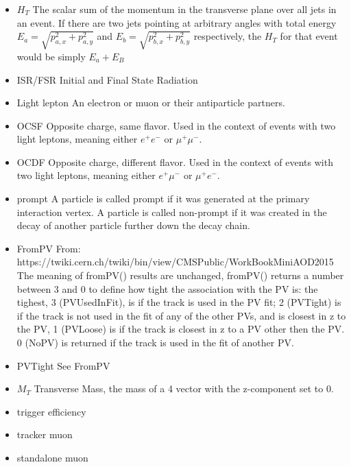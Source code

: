 \begin{itemize}

\item{$H_T$} The scalar sum of the momentum in the transverse plane over all jets in an event. If there are two jets pointing at arbitrary angles with total energy $E_a=\sqrt{p_{a,x}^2 + p_{a,y}^2}$ and $E_b=\sqrt{p_{b,x}^2 + p_{b,y}^2}$ respectively, the $H_T$ for that event would be simply $E_a + E_B$

\item{ISR/FSR} Initial and Final State Radiation

\item{Light lepton} An electron or muon or their antiparticle partners.

\item{OCSF} Opposite charge, same flavor. Used in the context of events with two light leptons, meaning either $e^+e^-$ or $\mu^+ \mu^-$.

\item{OCDF} Opposite charge, different flavor. Used in the context of events with two light leptons, meaning either $e^+\mu^-$ or $\mu^+ e^-$.

\item{prompt} A particle is called prompt if it was generated at the primary interaction vertex. A particle is called non-prompt if it was created in the decay of another particle further down the decay chain. 

\item{FromPV} From: https://twiki.cern.ch/twiki/bin/view/CMSPublic/WorkBookMiniAOD2015 The meaning of fromPV() results are unchanged, fromPV() returns a number between 3 and 0 to define how tight the association with the PV is: 
the tighest, 3 (PVUsedInFit), is if the track is used in the PV fit;
2 (PVTight) is if the track is not used in the fit of any of the other PVs, and is closest in z to the PV,
1 (PVLoose) is if the track is closest in z to a PV other then the PV.
0 (NoPV) is returned if the track is used in the fit of another PV.

\item{PVTight} See FromPV

\item{$M_T$} Transverse Mass, the mass of a 4 vector with the z-component set to 0.

\item{trigger efficiency}

\item{tracker muon}
\item{standalone muon}
\end{itemize}
